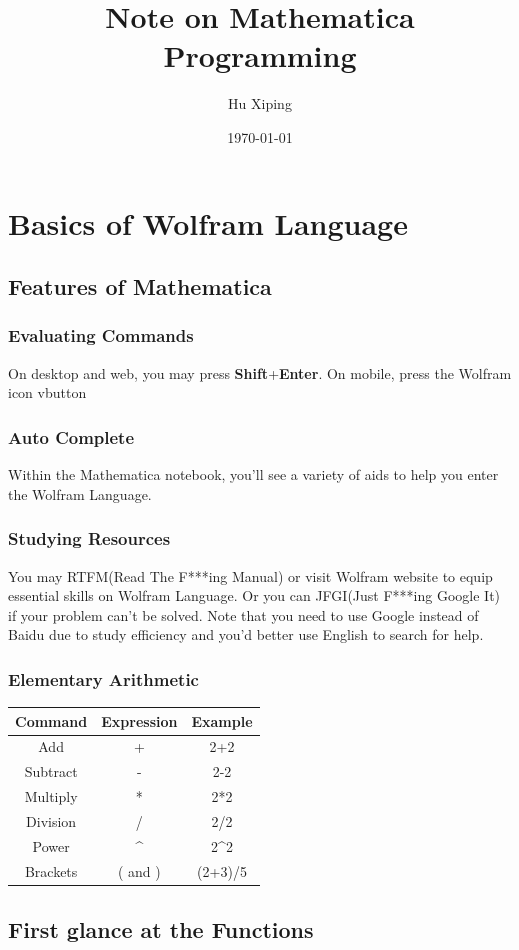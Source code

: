 \documentclass[10pt]{book}
\begin{document}
\sffamily
\author{Hu Xiping}
\title{Note on Mathematica Programming}
\date{\today}
\maketitle
\tableofcontents
\part{Basics of Wolfram Language}
\chapter{Features of Mathematica}
\section{Evaluating Commands}
On desktop and web, you may press \textbf{Shift}+\textbf{Enter}. On mobile, press the Wolfram icon vbutton
\section{Auto Complete}
Within the Mathematica notebook, you'll see a variety of aids to help you enter the Wolfram Language.
\section{Studying Resources}
You may RTFM(Read The F***ing Manual) or visit Wolfram website to equip essential skills on Wolfram Language. Or you can JFGI(Just F***ing Google It) if your problem can't be solved. Note that you need to use Google instead of Baidu due to study efficiency and you'd better use English to search for help.
\section{Elementary Arithmetic}
\begin{tabular}{|c|c|c|}
\hline 
Command & Expression & Example \\ 
\hline 
Add & + & 2+2 \\ 
\hline
Subtract & - & 2-2 \\ 
\hline
Multiply & * & 2*2 \\ 
\hline
Division & / & 2/2 \\ 
\hline
Power & \^{} & 2\^{}2 \\ 
\hline
Brackets & ( and ) & (2+3)/5 \\
\hline
\end{tabular} 
\chapter{First glance at the Functions}
\end{document}
